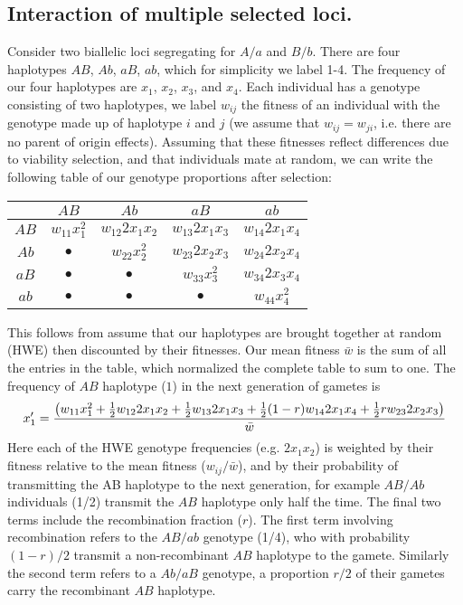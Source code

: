 \subsection{Interaction of multiple selected loci.}

Consider two biallelic loci segregating for $A/a$ and $B/b$. There are four haplotypes $AB$, $Ab$, $aB$, $ab$, which for simplicity we label 1-4. The frequency of our four haplotypes are $x_1$, $x_2$, $x_3$, and $x_4$. Each individual has a genotype consisting of two haplotypes, we label $w_{ij}$ the fitness of an individual with the genotype made up of haplotype $i$ and $j$ (we assume that $w_{ij}=w_{ji}$, i.e. there are no parent of origin effects). Assuming that these fitnesses reflect differences due to viability selection, and that individuals mate at random, we can write the following table of our genotype proportions after selection:\\
\begin{center}
\begin{tabular}{c|cccc}
         & $AB$			& $Ab$				& $aB$				& $ab$\\
\hline
$AB$ & $w_{11} x_1^2$ 	& $w_{12} 2 x_1 x_2$  	& $w_{13} 2 x_1 x_3$ 	& $w_{14} 2 x_1 x_4$ \\
$Ab$ & $\bullet$ 	  	& $w_{22} x_2^2$ 	  	& $w_{23} 2 x_2 x_3$  	& $w_{24} 2 x_2 x_4$ \\  
$aB$ & $\bullet$ 		& $\bullet$ 			& $w_{33} x_3^2$ 	  	& $w_{34} 2 x_3 x_4$ \\  
$ab$ & $\bullet$ 		& $\bullet$			& $\bullet$ 			&  $w_{44} x_4^2$ \\
\end{tabular}
\end{center}
This follows from assume that our haplotypes are brought together at random (HWE) then discounted by their fitnesses. Our mean fitness $\bar{w}$ is the sum of all the entries in the table, which normalized the complete table to sum to one. The frequency of $AB$ haplotype ($1$) in the next generation of gametes is
\begin{equation}
x_1' = \frac{\big( w_{11} x_1^2 +	 \tfrac{1}{2} w_{12} 2 x_1 x_2  + \tfrac{1}{2} w_{13} 2x_1 x_3  +	 \tfrac{1}{2} (1-r) w_{14} 2 x_1 x_4 + \tfrac{1}{2} r w_{23} 2 x_2 x_3   \big)}{ \bar{w} } \label{eqn:hapfreq}
\end{equation}
Here each of the HWE genotype frequencies (e.g. $2x_1x_2$) is weighted by their fitness relative to the mean fitness ($w_{ij}/\bar{w}$), and by their probability of transmitting the AB haplotype to the next generation, for example $AB/Ab$ individuals (1/2) transmit the $AB$ haplotype only half the time. The final two terms include the recombination fraction ($r$). The first term involving recombination refers to the $AB/ab$ genotype (1/4), who with probability $(1-r)/2$ transmit a non-recombinant $AB$ haplotype to the gamete. Similarly the second term refers to a  $Ab/aB$ genotype, a proportion $r/2$ of their gametes carry the recombinant $AB$ haplotype. 


